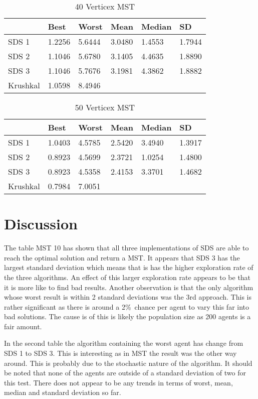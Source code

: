 \documentclass{AISB2008}
\begin{document}
{\begin{table}
\centering
\caption{40 Verticex MST}
\begin{tabular}{l|lllll}
	 	  & Best    & Worst    &   Mean  & Median & SD \\ \hline
SDS 1 & 1.2256	 & 5.6444  & 3.0480 & 1.4553 & 1.7944 \\
SDS 2 & 1.1046	 & 5.6780	& 3.1405 & 4.4635 & 1.8890 \\	
SDS 3 & 1.1046	 & 5.7676	& 3.1981 & 4.3862 & 1.8882 \\	
Krushkal      & 1.0598	 & 8.4946 \\
\end{tabular}
\end{table}

\begin{table}
\centering
\caption{50 Verticex MST}
\begin{tabular}{l|lllll}
	   & Best    & Worst    &   Mean  & Median & SD \\ \hline
SDS 1 &  1.0403 & 4.5785	& 2.5420	& 3.4940	& 1.3917 \\
SDS 2 & 0.8923	 & 4.5699	& 2.3721	& 1.0254	& 1.4800 \\	
SDS 3 & 0.8923	 & 4.5358	& 2.4153	& 3.3701	& 1.4682 \\	
Krushkal &	0.7984 &	7.0051 \\
\end{tabular}
\end{table}



\section{Discussion}

The table MST 10 has shown that all three implementations of SDS are able to reach the optimal solution and return a MST. It appears that SDS 3 has the largest standard deviation which means that is has the higher exploration rate of the three algorithms. An effect of this larger exploration rate appears to be that it is more like to find bad results. Another observation is that the only algorithm whose worst result is within 2 standard deviations was the 3rd approach. This is rather significant as there is around a 2\%\ chance per agent to vary this far into bad solutions. The cause is of this is likely the population size as 200 agents is a fair amount.

In the second table the algorithm containing the worst agent has change from SDS 1 to SDS 3. This is interesting as in MST the result was the other way around. This is probably due to the stochastic nature of the algorithm. It should be noted that none of the agents are outside of a standard deviation of two for this test. There does not appear to be any trends in terms of worst, mean, median and standard deviation so far.

}
\end{document}

